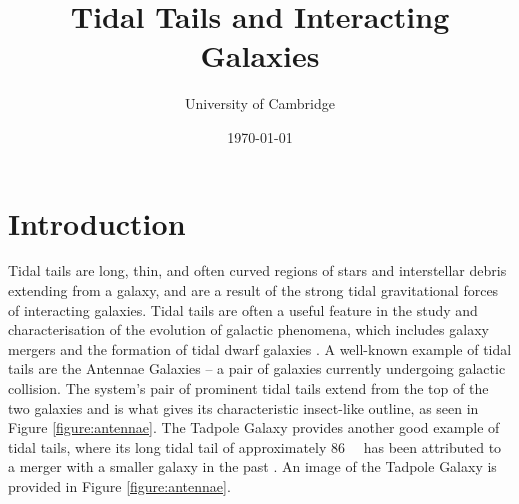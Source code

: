 \documentclass[twoside,twocolumn]{article}
\title{Tidal Tails and Interacting Galaxies} %
\author{%
    \normalsize University of Cambridge \\ %
    }
\date{
    \today \\
} %
\begin{document}
\maketitle

\section{Introduction}
    Tidal tails are long, thin, and often curved regions of stars and interstellar debris extending from a galaxy, and are a result of the strong tidal gravitational forces of interacting galaxies. Tidal tails are often a useful feature in the study and characterisation of the evolution of galactic phenomena, which includes galaxy mergers and the formation of tidal dwarf galaxies \cite{alavi}. A well-known example of tidal tails are the Antennae Galaxies -- a pair of galaxies currently undergoing galactic collision. The system's pair of prominent tidal tails extend from the top of the two galaxies and is what gives its characteristic insect-like outline, as seen in Figure \ref{figure:antennae}. The Tadpole Galaxy provides another good example of tidal tails, where its long tidal tail of approximately \SI{86}{\kilo\parsec} has been attributed to a merger with a smaller galaxy in the past \cite{tadpole}. An image of the Tadpole Galaxy is provided in Figure \ref{figure:antennae}.
    
\end{document}
